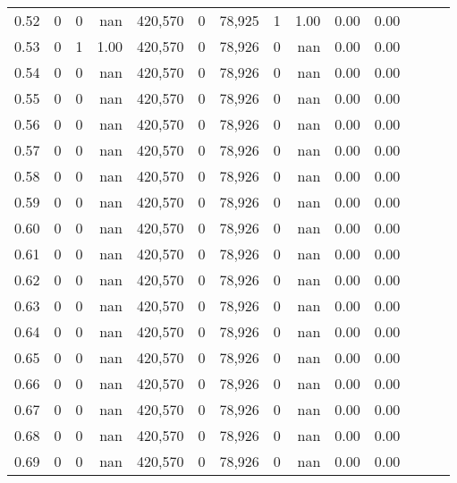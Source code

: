 \begin{tabular}{rrrrrrrrrrrrrr}
0.52 &       0 &      0 &   nan &  420,570 &        0 &  78,925 &       1 &  1.00 &  0.00 &      0.00 \\
0.53 &       0 &      1 &  1.00 &  420,570 &        0 &  78,926 &       0 &   nan &  0.00 &      0.00 \\
0.54 &       0 &      0 &   nan &  420,570 &        0 &  78,926 &       0 &   nan &  0.00 &      0.00 \\
0.55 &       0 &      0 &   nan &  420,570 &        0 &  78,926 &       0 &   nan &  0.00 &      0.00 \\
0.56 &       0 &      0 &   nan &  420,570 &        0 &  78,926 &       0 &   nan &  0.00 &      0.00 \\
0.57 &       0 &      0 &   nan &  420,570 &        0 &  78,926 &       0 &   nan &  0.00 &      0.00 \\
0.58 &       0 &      0 &   nan &  420,570 &        0 &  78,926 &       0 &   nan &  0.00 &      0.00 \\
0.59 &       0 &      0 &   nan &  420,570 &        0 &  78,926 &       0 &   nan &  0.00 &      0.00 \\
0.60 &       0 &      0 &   nan &  420,570 &        0 &  78,926 &       0 &   nan &  0.00 &      0.00 \\
0.61 &       0 &      0 &   nan &  420,570 &        0 &  78,926 &       0 &   nan &  0.00 &      0.00 \\
0.62 &       0 &      0 &   nan &  420,570 &        0 &  78,926 &       0 &   nan &  0.00 &      0.00 \\
0.63 &       0 &      0 &   nan &  420,570 &        0 &  78,926 &       0 &   nan &  0.00 &      0.00 \\
0.64 &       0 &      0 &   nan &  420,570 &        0 &  78,926 &       0 &   nan &  0.00 &      0.00 \\
0.65 &       0 &      0 &   nan &  420,570 &        0 &  78,926 &       0 &   nan &  0.00 &      0.00 \\
0.66 &       0 &      0 &   nan &  420,570 &        0 &  78,926 &       0 &   nan &  0.00 &      0.00 \\
0.67 &       0 &      0 &   nan &  420,570 &        0 &  78,926 &       0 &   nan &  0.00 &      0.00 \\
0.68 &       0 &      0 &   nan &  420,570 &        0 &  78,926 &       0 &   nan &  0.00 &      0.00 \\
0.69 &       0 &      0 &   nan &  420,570 &        0 &  78,926 &       0 &   nan &  0.00 &      0.00 \\

\end{tabular}
